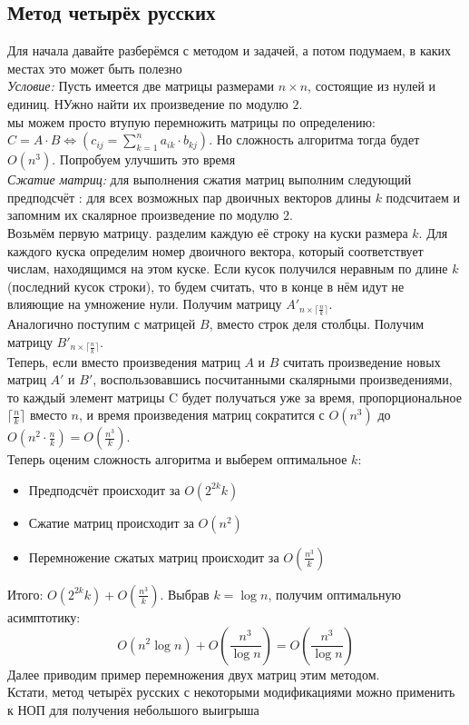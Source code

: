 \documentclass[a4paper, 12pt]{article}
\theoremstyle{plain}
\theoremstyle{definition}
\theoremstyle{remark}
\begin{document}
\subsection{Метод четырёх русских}
Для начала давайте разберёмся с методом и задачей, а потом подумаем, в каких местах это может быть полезно\\
\textit{Условие:} Пусть имеется две матрицы размерами $n\times n$, состоящие из нулей и единиц. НУжно найти их произведение по модулю $2$.\\
 мы можем просто втупую перемножить матрицы по определению: $C=A\cdot B \Leftrightarrow \left(c_{ij}=\sum\limits_{k=1}^na_{ik}\cdot b_{kj}\right)$. Но сложность алгоритма тогда будет $O(n^3)$. Попробуем улучшить это время\\
\textit{Сжатие матриц:} для выполнения сжатия матриц выполним следующий предподсчёт : для всех возможных пар двоичных векторов длины $k$ подсчитаем и запомним их скалярное произведение по модулю $2$.\\
Возьмём первую матрицу. разделим каждую её строку на куски размера $k$. Для каждого куска определим номер двоичного вектора, который соответствует числам, находящимся на этом куске. Если кусок получился неравным по длине $k$ (последний кусок строки), то будем считать, что в конце в нём идут не влияющие на умножение нули. Получим матрицу $A'_{n\times\lceil\frac{n}{k}\rceil}$.\\
Аналогично поступим с матрицей $B$, вместо строк деля столбцы. Получим матрицу $B'_{n\times\lceil\frac{n}{k}\rceil}$.\\
Теперь, если вместо произведения матриц $A$ и $B$ считать произведение новых матриц $A'$ и $B'$, воспользовавшись посчитанными скалярными произведениями, то каждый элемент матрицы C будет получаться уже за время, пропорциональное $\lceil\frac{n}{k}\rceil$ вместо $n$, и время произведения матриц сократится с $O(n^3)$ до $O(n^2\cdot \frac{n}{k})=O(\frac{n^3}{k})$.\\
Теперь оценим сложность алгоритма и выберем оптимальное $k$:
\begin{itemize}
	\item Предподсчёт происходит за $O(2^{2k}k)$
	\item Сжатие матриц происходит за $O(n^2)$
	\item Перемножение сжатых матриц происходит за $O(\frac{n^3}{k})$
\end{itemize}
Итого: $O(2^{2k}k)+O(\frac{n^3}{k})$. Выбрав $k=\log n$, получим оптимальную асимптотику:
\[O(n^2\log n)+O(\frac{n^3}{\log n})=O(\frac{n^3}{\log n})\]
Далее приводим пример перемножения двух матриц этим методом.\\
Кстати, метод четырёх русских с некоторыми модификациями можно применить к НОП для получения небольшого выигрыша
\end{document}
